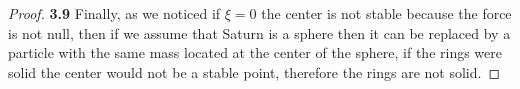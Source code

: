 \documentclass[11pt]{article}
\begin{document}
\begin{proof}{\textbf{3.9}}
        Finally, as we noticed if $\xi = 0$ the center is not stable because the
        force is not null, then if we assume that Saturn is a sphere then it
        can be replaced by a particle with the same mass located at the center
        of the sphere, if the rings were solid the center would not be a stable
        point, therefore the rings are not solid.
    \end{proof}
\end{document}
